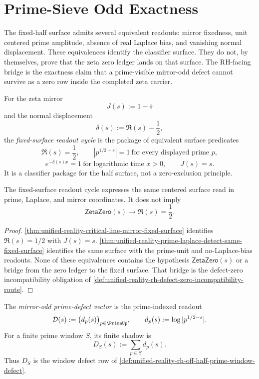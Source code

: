 \section{Prime-Sieve Odd Exactness}
\label{sec:unified-reality-prime-sieve-odd-exactness}

The fixed-half surface admits several equivalent readouts: mirror
fixedness, unit centered prime amplitude, absence of real Laplace bias,
and vanishing normal displacement.  These equivalences identify the
classifier surface.  They do not, by themselves, prove that the zeta
zero ledger lands on that surface.  The RH-facing bridge is the exactness
claim that a prime-visible mirror-odd defect cannot survive as a zero row
inside the completed zeta carrier.

\begin{definition}
\label{def:unified-reality-fixed-surface-readout-cycle}
For the zeta mirror
$$
J(s):=1-\overline{s}
$$
and the normal displacement
$$
\delta(s):=\Re(s)-\frac12,
$$
the \emph{fixed-surface readout cycle} is the package of equivalent
surface predicates
$$
\Re(s)=\frac12,
\qquad
|p^{1/2-s}|=1\ \text{for every displayed prime }p,
$$
$$
e^{-\delta(s)x}=1\ \text{for logarithmic time }x>0,
\qquad
J(s)=s.
$$
It is a classifier package for the half surface, not a zero-exclusion
principle.
\end{definition}

\begin{theorem}
\label{thm:unified-reality-fixed-surface-cycle-readout-equivalence}
The fixed-surface readout cycle expresses the same centered surface read
in prime, Laplace, and mirror coordinates.  It does not imply
$$
\mathsf{ZetaZero}(s)\to \Re(s)=\frac12.
$$
\end{theorem}

\begin{proof}
\autoref{thm:unified-reality-critical-line-mirror-fixed-surface}
identifies $\Re(s)=1/2$ with $J(s)=s$.
\autoref{thm:unified-reality-prime-laplace-detect-same-fixed-surface}
identifies the same surface with the prime-unit and no-Laplace-bias
readouts.  None of these equivalences contains the hypothesis
$\mathsf{ZetaZero}(s)$ or a bridge from the zero ledger to the fixed
surface.  That bridge is the defect-zero incompatibility obligation of
\autoref{def:unified-reality-rh-defect-zero-incompatibility-route}.
\end{proof}

\begin{definition}
\label{def:unified-reality-mirror-odd-prime-defect-vector}
The \emph{mirror-odd prime-defect vector} is the prime-indexed readout
$$
\mathcal D(s)
:=
\bigl(d_p(s)\bigr)_{p\in\PrimeUp},
\qquad
d_p(s):=\log |p^{1/2-s}|.
$$
For a finite prime window $S$, its finite shadow is
$$
D_S(s):=\sum_{p\in S} d_p(s).
$$
Thus $D_S$ is the window defect row of
\autoref{def:unified-reality-rh-off-half-prime-window-defect}.
\end{definition}

